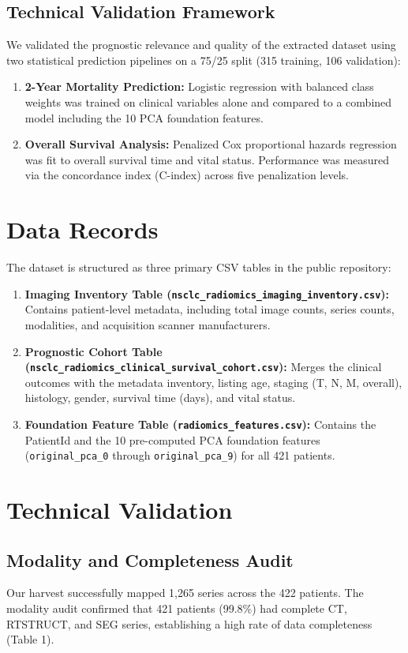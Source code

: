 \documentclass[11pt]{article}
\begin{document}
\subsection*{Technical Validation Framework}
We validated the prognostic relevance and quality of the extracted dataset using two statistical prediction pipelines on a 75/25 split (315 training, 106 validation):
\begin{enumerate}
\item \textbf{2-Year Mortality Prediction:} Logistic regression with balanced class weights was trained on clinical variables alone and compared to a combined model including the 10 PCA foundation features.
\item \textbf{Overall Survival Analysis:} Penalized Cox proportional hazards regression was fit to overall survival time and vital status. Performance was measured via the concordance index (C-index) across five penalization levels.
\end{enumerate}

\section*{Data Records}
The dataset is structured as three primary CSV tables in the public repository:
\begin{enumerate}
\item \textbf{Imaging Inventory Table (\texttt{nsclc\_radiomics\_imaging\_inventory.csv}):} Contains patient-level metadata, including total image counts, series counts, modalities, and acquisition scanner manufacturers.
\item \textbf{Prognostic Cohort Table (\texttt{nsclc\_radiomics\_clinical\_survival\_cohort.csv}):} Merges the clinical outcomes with the metadata inventory, listing age, staging (T, N, M, overall), histology, gender, survival time (days), and vital status.
\item \textbf{Foundation Feature Table (\texttt{radiomics\_features.csv}):} Contains the PatientId and the 10 pre-computed PCA foundation features (\texttt{original\_pca\_0} through \texttt{original\_pca\_9}) for all 421 patients.
\end{enumerate}

\section*{Technical Validation}
\subsection*{Modality and Completeness Audit}
Our harvest successfully mapped 1,265 series across the 422 patients. The modality audit confirmed that 421 patients (99.8\%) had complete CT, RTSTRUCT, and SEG series, establishing a high rate of data completeness (Table 1).
\end{document}
